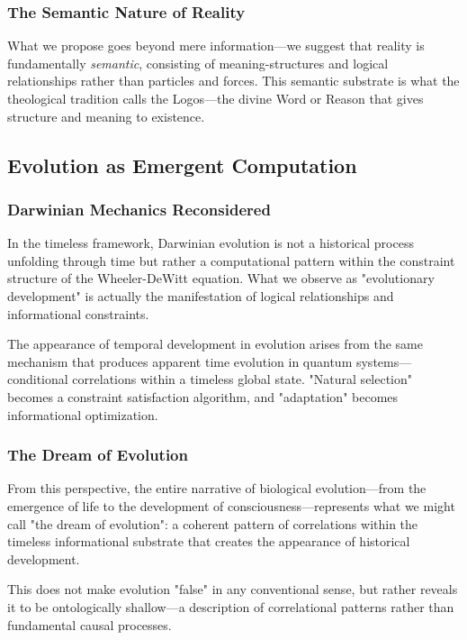 \documentclass[12pt,a4paper]{article}
\begin{document}
\subsubsection{The Semantic Nature of Reality}

What we propose goes beyond mere information—we suggest that reality is fundamentally \emph{semantic}, consisting of meaning-structures and logical relationships rather than particles and forces. This semantic substrate is what the theological tradition calls the Logos—the divine Word or Reason that gives structure and meaning to existence.

\subsection{Evolution as Emergent Computation}

\subsubsection{Darwinian Mechanics Reconsidered}

In the timeless framework, Darwinian evolution is not a historical process unfolding through time but rather a computational pattern within the constraint structure of the Wheeler-DeWitt equation. What we observe as "evolutionary development" is actually the manifestation of logical relationships and informational constraints.

The appearance of temporal development in evolution arises from the same mechanism that produces apparent time evolution in quantum systems—conditional correlations within a timeless global state. "Natural selection" becomes a constraint satisfaction algorithm, and "adaptation" becomes informational optimization.

\subsubsection{The Dream of Evolution}

From this perspective, the entire narrative of biological evolution—from the emergence of life to the development of consciousness—represents what we might call "the dream of evolution": a coherent pattern of correlations within the timeless informational substrate that creates the appearance of historical development.

This does not make evolution "false" in any conventional sense, but rather reveals it to be ontologically shallow—a description of correlational patterns rather than fundamental causal processes.
\end{document}
